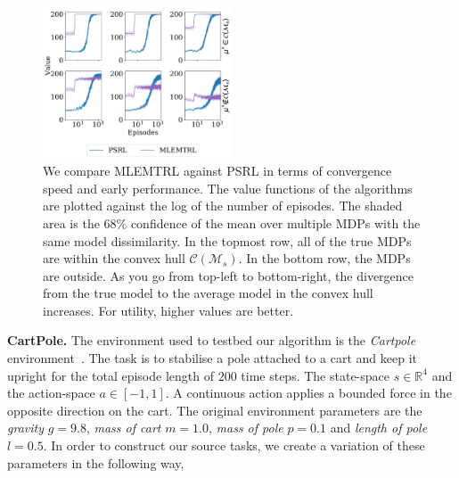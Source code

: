 \begin{figure}[t!]
    \centering
    \includegraphics[width=0.5\textwidth]{img/time_experiment.pdf}
    \caption{We compare MLEMTRL against PSRL in terms of convergence speed and early performance. The value functions of the algorithms are plotted against the log of the number of episodes. The shaded area is the $68\%$ confidence of the mean over multiple MDPs with the same model dissimilarity. In the topmost row, all of the true MDPs are within the convex hull $\mathcal{C}(\mathcal{M}_s)$. In the bottom row, the MDPs are outside. As you go from top-left to bottom-right, the divergence from the true model to the average model in the convex hull increases. For utility, higher values are better.}
    \label{fig:time}
\end{figure}


\noindent\textbf{CartPole.}
The environment used to testbed our algorithm is the \emph{Cartpole} environment~\citep{barto1983neuronlike}. The task is to stabilise a pole attached to a cart and keep it upright for the total episode length of $200$ time steps. The state-space $s \in \mathbb{R}^4$ and the action-space $a \in [-1, 1]$. A continuous action applies a bounded force in the opposite direction on the cart. The original environment parameters are the \emph{gravity} $g=9.8$, \emph{mass of cart} $m=1.0$, \emph{mass of pole} $p=0.1$ and \emph{length of pole} $l = 0.5$. In order to construct our source tasks, we create a variation of these parameters in the following way,

